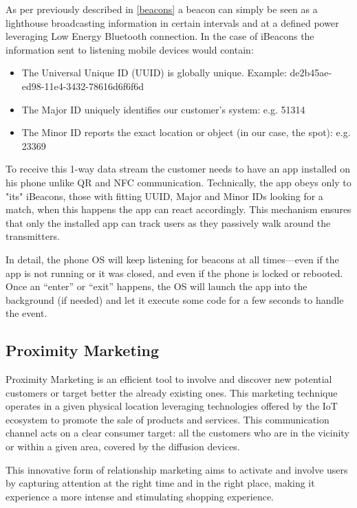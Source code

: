 As per previously described in \ref{beacons} a beacon can simply be seen as a lighthouse broadcasting information in certain intervals and at a defined power leveraging Low Energy Bluetooth connection. In the case of iBeacons the information sent to listening mobile devices would contain:


\begin{itemize}
  \item The Universal Unique ID (UUID) is globally unique. Example: de2b45ae-ed98-11e4-3432-78616d6f6f6d
  \item The Major ID uniquely identifies our customer’s system: e.g. 51314
  \item The Minor ID reports the exact location or object (in our case, the spot): e.g. 23369
\end{itemize}

To receive this 1-way data stream the customer needs to have an app installed on his phone unlike QR and NFC communication. Technically, the app obeys only to "its" iBeacons, those with fitting UUID, Major and Minor IDs looking for a match, when this happens the app can react accordingly. This mechanism ensures that only the installed app can track users as they passively walk around the transmitters. 

In detail, the phone OS will keep listening for beacons at all times—even if the app is not running or it was closed, and even if the phone is locked or rebooted. Once an “enter” or “exit” happens, the OS will launch the app into the background (if needed) and let it execute some code for a few seconds to handle the event.

\subsection{Proximity Marketing}
\label{ssection:proximity-marketing}

Proximity Marketing is an efficient tool to involve and discover new potential customers or target better the already existing ones. This marketing technique operates in a given physical location leveraging technologies offered by the IoT ecosystem to promote the sale of products and services.  This communication channel acts on a clear consumer target: all the customers who are in the vicinity or within a given area, covered by the diffusion devices.

This innovative form of relationship marketing aims to activate and involve users by capturing attention at the right time and in the right place, making it experience a more intense and stimulating shopping experience.

